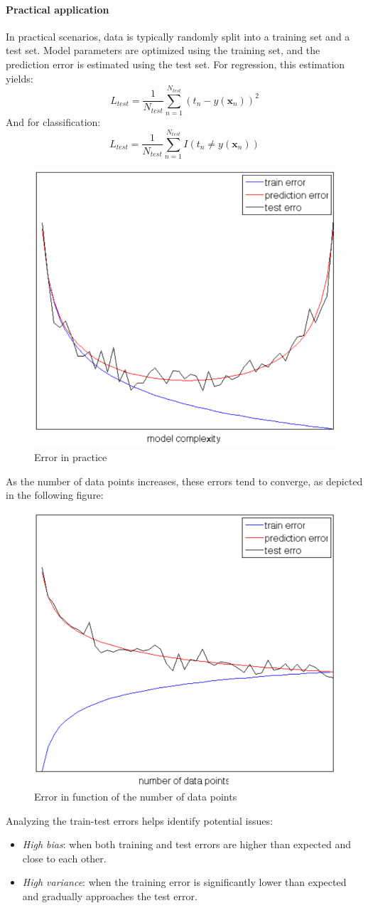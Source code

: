 \paragraph*{Practical application}
In practical scenarios, data is typically randomly split into a training set and a test set. 
Model parameters are optimized using the training set, and the prediction error is estimated using the test set. 
For regression, this estimation yields:
\[L_{test}=\dfrac{1}{N_{test}}\sum_{n=1}^{N_{test}}{\left(t_n-y(\textbf{x}_n)\right)}^2\]
And for classification:
\[L_{test}=\dfrac{1}{N_{test}}\sum_{n=1}^{N_{test}}I(t_n\neq y(\textbf{x}_n))\]
\begin{figure}[H]
    \centering
    \includegraphics[width=0.35\linewidth]{images/error1.png}
    \caption{Error in practice}
\end{figure}
As the number of data points increases, these errors tend to converge, as depicted in the following figure:
\begin{figure}[H]
    \centering
    \includegraphics[width=0.35\linewidth]{images/error2.png}
    \caption{Error in function of the number of data points}
\end{figure}
Analyzing the train-test errors helps identify potential issues:
\begin{itemize}
    \item \textit{High bias}: when both training and test errors are higher than expected and close to each other.
    \item \textit{High variance}: when the training error is significantly lower than expected and gradually approaches the test error.
\end{itemize}

